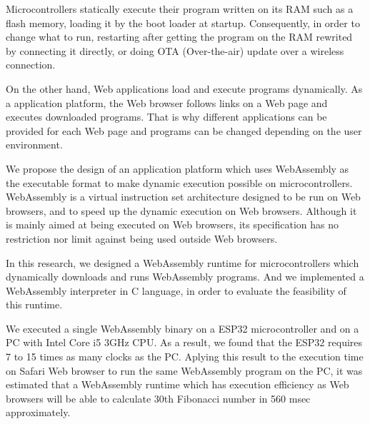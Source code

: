 \begin{eabstract}

  Microcontrollers statically execute their program written on its RAM such as a flash memory, loading it by the boot loader at startup.
  Consequently, in order to change what to run, restarting after getting the program on the RAM rewrited by connecting it directly, or doing OTA (Over-the-air) update over a wireless connection.

  On the other hand, Web applications load and execute programs dynamically.
  As a application platform, the Web browser follows links on a Web page and executes downloaded programs.
  That is why different applications can be provided for each Web page and programs can be changed depending on the user environment.

  We propose the design of an application platform which uses WebAssembly as the executable format to make dynamic execution possible on microcontrollers.
  WebAssembly is a virtual instruction set architecture designed to be run on Web browsers, and to speed up the dynamic execution on Web browsers.
  Although it is mainly aimed at being executed on Web browsers, its specification has no restriction nor limit against being used outside Web browsers.

  In this research, we designed a WebAssembly runtime for microcontrollers which dynamically downloads and runs WebAssembly programs.
  And we implemented a WebAssembly interpreter in C language, in order to evaluate the feasibility of this runtime.

  We executed a single WebAssembly binary on a ESP32 microcontroller and on a PC with Intel Core i5 3GHz CPU.
  As a result, we found that the ESP32 requires 7 to 15 times as many clocks as the PC.
  Aplying this result to the execution time on Safari Web browser to run the same WebAssembly program on the PC, it was estimated that a WebAssembly runtime which has execution efficiency as Web browsers will be able to calculate 30th Fibonacci number in 560 msec approximately.

\end{eabstract}
